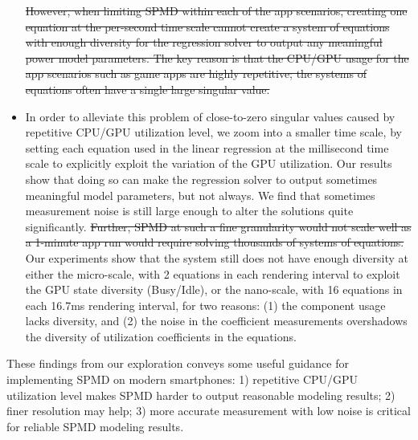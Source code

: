 \begin{itemize}
\st{
However, when limiting SPMD within each of the app scenarios, creating 
one equation at the per-second time scale 
cannot create a system of equations with enough diversity for 
the regression solver to output any meaningful power model parameters.
%
The key reason is that the CPU/GPU usage for the app scenarios such 
as game apps are highly repetitive; 
the systems of equations often have a single large singular value.  }
\item 
{\color{blue}In order to alleviate this problem of close-to-zero singular values caused by repetitive CPU/GPU utilization level}, we zoom into a smaller time scale, by setting each 
equation {\color{blue}used in the linear regression} at the millisecond time scale
to explicitly exploit the {\color{blue} variation of the GPU utilization}. Our results show that doing 
so can 
make the regression solver to  output sometimes meaningful model parameters, {\color{blue}but not always. We find that sometimes measurement noise is still large enough to alter the solutions quite significantly.}
\st{Further, SPMD at such a fine granularity would not scale well as a 1-minute app run would require solving thousands of systems of equations. }
Our experiments show that the system still does not have enough diversity  
    at either the micro-scale, \ie with 2 equations in each rendering interval to exploit the GPU state diversity (Busy/Idle), or the nano-scale, \ie with 16 equations in each 16.7ms rendering interval, for two reasons: (1) the component usage lacks diversity,
    and (2) the noise in the coefficient measurements overshadows the diversity of utilization coefficients in the equations. 
\fi
\end{itemize}
    
{\color{blue}These findings from our exploration conveys some useful guidance for implementing SPMD on modern smartphones: 1) repetitive CPU/GPU utilization level makes SPMD harder to output reasonable modeling results; 2) finer resolution may help; 3) more accurate measurement with low noise is critical for reliable SPMD modeling results.}

